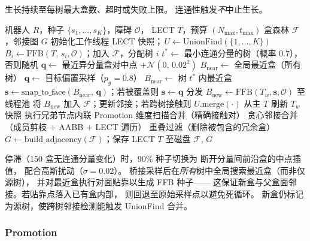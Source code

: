 \documentclass[journal]{IEEEtran}
\begin{document}
生长持续至每树最大盒数、超时或失败上限。
连通性触发\emph{不}中止生长。

\begin{algorithm}[t]
\caption{协调多树盒森林构建}\label{alg:build}
\footnotesize
\begin{algorithmic}[1]
\REQUIRE 机器人 $R$，种子 $\{s_1,\ldots,s_K\}$，障碍 $\mathcal{O}$，
  LECT $T$，预算 $(N_{\max}, t_{\max})$
\ENSURE 盒森林 $\mathcal{F}$，邻接图 $G$
\STATE 初始化工作线程 LECT 快照；$\,U \leftarrow \text{UnionFind}(\{1,\ldots,K\})$
  \STATE $B_i \leftarrow \text{FFB}(T,\,s_i,\mathcal{O})$；加入 $\mathcal{F}$，分配树 $i$
\ENDFOR
{}
  \STATE $t^* \leftarrow$ 最小连通分量的树（概率 0.7），否则随机
    \STATE $\bm{q} \leftarrow$ 最近异分量盒对中点
      $+ \mathcal{N}(0,\,0.02^2)$
    \STATE $B_{\text{near}} \leftarrow$ 全局最近盒（所有树）
  \ELSE
    \STATE $\bm{q} \leftarrow$ 目标偏置采样（$p_g{=}0.8$）
    \STATE $B_{\text{near}} \leftarrow$ 树 $t^*$ 内最近盒
  \ENDIF
  \STATE $\bm{s} \leftarrow \text{snap\_to\_face}(B_{\text{near}},\, \bm{q})$；若被覆盖则 $\bm{s} \leftarrow \bm{q}$
  \STATE 分发 $B_{\text{new}} \leftarrow \text{FFB}(T_w, \bm{s}, \mathcal{O})$ 至线程池
    \STATE 将 $B_{\text{new}}$ 加入 $\mathcal{F}$；更新邻接；若跨树接触则 $U.\text{merge}(\cdot)$
  \ENDIF
    \STATE 从主 $T$ 刷新 $T_w$ 快照
  \ENDIF
    \STATE 执行兄弟节点内联 Promotion
  \ENDIF
\ENDWHILE
\STATE {}
\STATE 维度扫描合并（精确接触对）
\STATE 贪心邻接合并（成员剪枝 $+$ AABB $+$ LECT 遍历）
\STATE 重叠过滤（删除被包含的冗余盒）
\STATE $G \leftarrow \mathrm{build\_adjacency}(\mathcal{F})$；保存 LECT $T$ 至磁盘
\RETURN $\mathcal{F},\, G$
\end{algorithmic}
\end{algorithm}

停滞（150 盒无连通分量变化）时，90\% 种子切换为
断开分量间前沿盒的中点插值，
配合高斯扰动（$\sigma = 0.02$）。
桥接采样后在\emph{所有}树中全局搜索最近盒（而非仅源树），
并对最近盒执行对面贴靠以生成 FFB 种子——
这保证新盒与父盒面邻接。若贴靠点落入已有盒内部，
则回退至原始采样点以避免死循环。
新盒仍标记为源树，使跨树邻接检测能触发 UnionFind 合并。

\subsubsection{Promotion}\label{sec:promotion}
\end{document}

